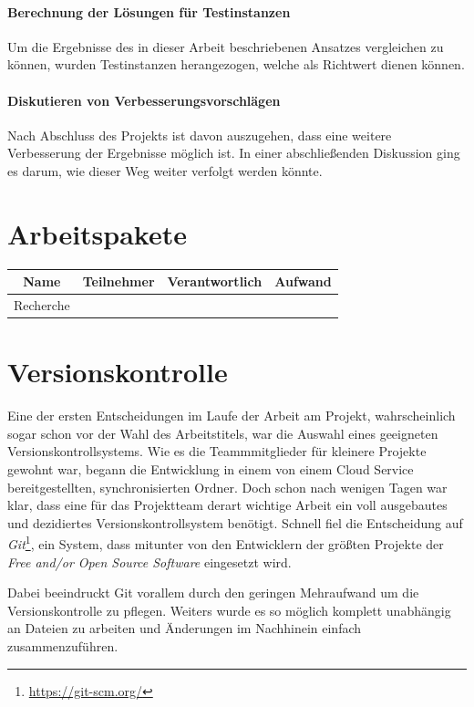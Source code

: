 \paragraph{Berechnung der Lösungen für Testinstanzen}{Um die Ergebnisse des in dieser Arbeit beschriebenen Ansatzes vergleichen zu können, wurden Testinstanzen herangezogen, welche als Richtwert dienen können.}
\paragraph{Diskutieren von Verbesserungsvorschlägen}{Nach Abschluss des Projekts ist davon auszugehen, dass eine weitere Verbesserung der Ergebnisse möglich ist. In einer abschließenden Diskussion ging es darum, wie dieser Weg weiter verfolgt werden könnte.}

\section{Arbeitspakete}
\label{sec:arbeitspakete}

\begin{tabular}{cccc}
	Name & Teilnehmer & Verantwortlich & Aufwand \\
	\hline\hline\hline
	Recherche & & & \\
	\hline\hline
\end{tabular}

\section{Versionskontrolle}
Eine der ersten Entscheidungen im Laufe der Arbeit am Projekt, wahrscheinlich sogar schon vor der Wahl des Arbeitstitels, war die Auswahl eines geeigneten Versionskontrollsystems. Wie es die Teammmitglieder für kleinere Projekte gewohnt war, begann die Entwicklung in einem von einem Cloud Service bereitgestellten, synchronisierten Ordner. Doch schon nach wenigen Tagen war klar, dass eine für das Projektteam derart wichtige Arbeit ein voll ausgebautes und dezidiertes Versionskontrollsystem benötigt. Schnell fiel die Entscheidung auf \textit{Git}\footnote{\url{https://git-scm.org/}}, ein System, dass mitunter von den Entwicklern der größten Projekte der \textit{Free and/or Open Source Software} eingesetzt wird.

Dabei beeindruckt Git vorallem durch den geringen Mehraufwand um die Versionskontrolle zu pflegen. Weiters wurde es so möglich komplett unabhängig an Dateien zu arbeiten und Änderungen im Nachhinein einfach zusammenzuführen.

